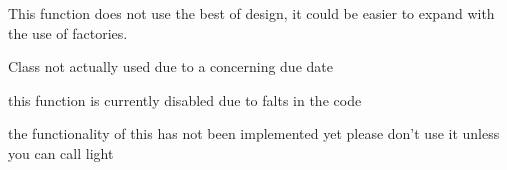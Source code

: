 
\begin{DoxyRefList}
\item[\label{bug__bug000001}%
\hypertarget{bug__bug000001}{}%
Class \hyperlink{class_asset_mng}{Asset\-Mng} ]This function does not use the best of design, it could be easier to expand with the use of factories.  
\item[\label{bug__bug000002}%
\hypertarget{bug__bug000002}{}%
Class \hyperlink{class_camera}{Camera} ]
\item[\label{bug__bug000003}%
\hypertarget{bug__bug000003}{}%
Class \hyperlink{class_loaderab}{Loaderab} ]Class not actually used due to a concerning due date  
\item[\label{bug__bug000004}%
\hypertarget{bug__bug000004}{}%
Member \hyperlink{class_render_a05951fdb27e9ad1fbc28be2c682aaf12}{Render\-:\-:set\-Colour} (float R, float G, float B)]this function is currently disabled due to falts in the code  
\item[\label{bug__bug000005}%
\hypertarget{bug__bug000005}{}%
Class \hyperlink{struct_vector3}{Vector3} ]
\item[\label{bug__bug000006}%
\hypertarget{bug__bug000006}{}%
Member \hyperlink{class_window_a0d3072ad7bb6198c4a8f8b2eee9cb65a}{Window\-:\-:enable\-Lighting} ()]the functionality of this has not been implemented yet please don't use it unless you can call light 
\end{DoxyRefList}